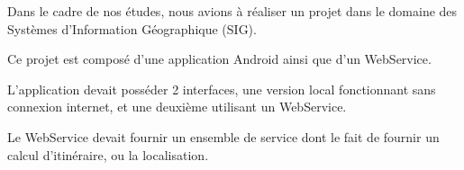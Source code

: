Dans le cadre de nos études, nous avions à réaliser un projet dans le domaine des Systèmes d'Information Géographique (SIG).

Ce projet est composé d'une application Android ainsi que d'un WebService.

L'application devait posséder 2 interfaces, une version local fonctionnant sans connexion internet, et une deuxième utilisant un WebService.

Le WebService devait fournir un ensemble de service dont le fait de fournir un calcul d'itinéraire, ou la localisation.
